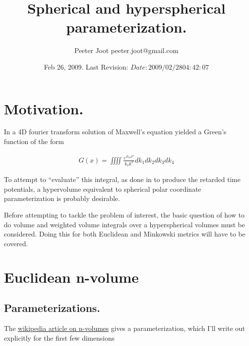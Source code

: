 \documentclass{article}
\title{ Spherical and hyperspherical parameterization. }
\author{Peeter Joot \quad peeter.joot@gmail.com }
\date{ Feb 26, 2009.  Last Revision: $Date: 2009/02/28 04:42:07 $ }
\begin{document}
\maketitle{}
\tableofcontents

\section{ Motivation. }

In \cite{PJ4dFourier} a 4D fourier transform solution 
of Maxwell's equation yielded a Green's function of the form

\begin{align*}
G(x) = \iiiint \frac{e^{i k_\mu x^\mu}}{k_\nu k^\nu} dk_1 dk_2 dk_3 dk_4
\end{align*}

To attempt to ``evaluate'' this integral, as done in
\cite{PJpoisson}
to produce the retarded time potentials,
a hypervolume equivalent to spherical polar coordinate
parameterization is probably desirable.

Before attempting to tackle the problem of interest, the basic question
of how to do volume and weighted volume integrals over a hyperspherical volumes
must be considered.  Doing this for both Euclidean and Minkowski metrics will have to be covered.

\section{ Euclidean n-volume }

\subsection{ Parameterizations. }

The \href{http://en.wikipedia.org/wiki/Hypersphere}{wikipedia article on n-volumes} gives a parameterization, which I'll write out explicitly for the first few dimensions
\end{document}
